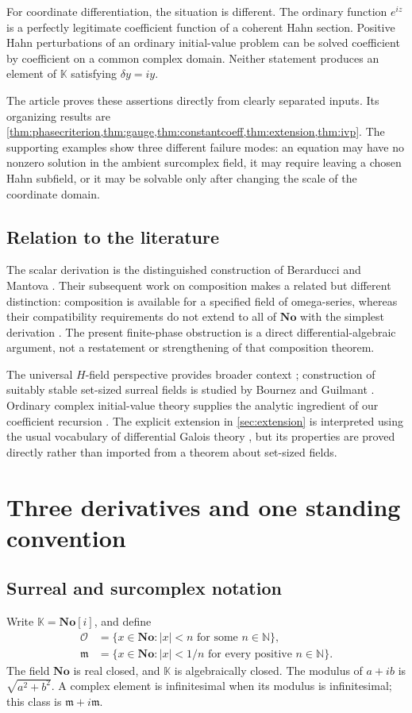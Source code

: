 \documentclass[11pt,letterpaper]{article}
\numberwithin{equation}{section}
\theoremstyle{definition}
\theoremstyle{remark}
\newcommand{\No}{\mathbf{No}}
\newcommand{\K}{\mathbb K}
\newcommand{\N}{\mathbb N}
\newcommand{\OO}{\mathcal O}
\newcommand{\mm}{\mathfrak m}
\begin{document}
For coordinate differentiation, the situation is different. The ordinary function $e^{iz}$ is a perfectly legitimate coefficient function of a coherent Hahn section. Positive Hahn perturbations of an ordinary initial-value problem can be solved coefficient by coefficient on a common complex domain. Neither statement produces an element of $\K$ satisfying $\delta y=iy$.

The article proves these assertions directly from clearly separated inputs. Its organizing results are \cref{thm:phasecriterion,thm:gauge,thm:constantcoeff,thm:extension,thm:ivp}. The supporting examples show three different failure modes: an equation may have no nonzero solution in the ambient surcomplex field, it may require leaving a chosen Hahn subfield, or it may be solvable only after changing the scale of the coordinate domain.

\subsection{Relation to the literature}
The scalar derivation is the distinguished construction of Berarducci and Mantova \cite{BM}. Their subsequent work on composition makes a related but different distinction: composition is available for a specified field of omega-series, whereas their compatibility requirements do not extend to all of $\No$ with the simplest derivation \cite[Theorems 8.2 and 8.4]{BMComposition}. The present finite-phase obstruction is a direct differential-algebraic argument, not a restatement or strengthening of that composition theorem.

The universal $H$-field perspective provides broader context \cite{ADH}; construction of suitably stable set-sized surreal fields is studied by Bournez and Guilmant \cite{BG}. Ordinary complex initial-value theory supplies the analytic ingredient of our coefficient recursion \cite{Teschl}. The explicit extension in \cref{sec:extension} is interpreted using the usual vocabulary of differential Galois theory \cite{Singer}, but its properties are proved directly rather than imported from a theorem about set-sized fields.

\section{Three derivatives and one standing convention}\label{sec:derivatives}

\subsection{Surreal and surcomplex notation}
Write $\K=\No[i]$, and define
\[
\begin{aligned}
 \OO&=\{x\in\No:|x|<n\text{ for some }n\in\N\},\\
 \mm&=\{x\in\No:|x|<1/n\text{ for every positive }n\in\N\}.
\end{aligned}
\]
The field $\No$ is real closed, and $\K$ is algebraically closed. The modulus of $a+ib$ is $\sqrt{a^2+b^2}$. A complex element is infinitesimal when its modulus is infinitesimal; this class is $\mm+i\mm$.
\end{document}
